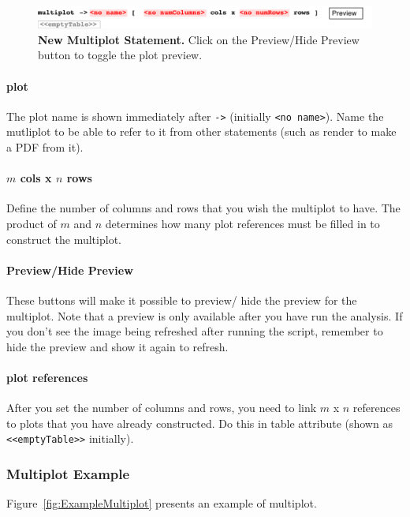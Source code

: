 \begin{figure}[h!tbp]
  \centering
  \includegraphics[width=\figWidthWide]{figures/NewMultiplot.pdf}
\caption[New Multiplot Statement.]{\textbf{New Multiplot Statement.} Click on the Preview/Hide Preview button to toggle the plot preview.}
\label{fig:NewMultiplot}
\end{figure}

\paragraph{plot}
The plot name is shown immediately after \texttt{->} (initially \texttt{<no name>}). Name the mutliplot to be able to refer to it from other statements (such as render to make a PDF from it).
\paragraph{$m$ cols x $n$ rows}
Define the number of columns and rows that you wish the multiplot to have. 
The product of $m$ and $n$ determines how many plot references must be filled in to construct the multiplot.

\paragraph{Preview/Hide Preview}
These buttons will make it possible to preview/ hide the preview for the multiplot. Note that a preview is only available after you have run the analysis. If you don't see the image being refreshed after running the script, remember to hide the preview and show it again to refresh.

\paragraph{plot references}
After you set the number of columns and rows, you need to link  $m$ x $n$ references to plots that you have already constructed. Do this in table attribute (shown as \texttt{<<emptyTable>>} initially).


\subsubsection{Multiplot Example}
Figure~\ref{fig:ExampleMultiplot} presents an example of multiplot.

